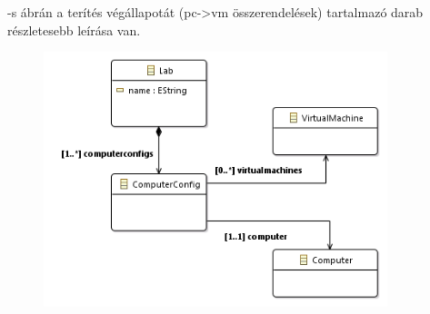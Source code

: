 -s ábrán a terítés végállapotát (pc->vm összerendelések) tartalmazó darab részletesebb leírása van.

\begin{figure}[ht]
	\centering
	\includegraphics[width=100mm, keepaspectratio]{figures/design_lab.png}
	\caption{}
	\label{fig:designlab}
\end{figure}

